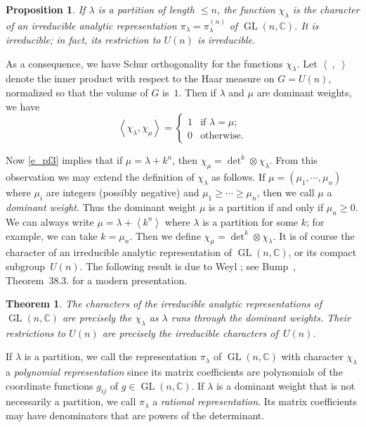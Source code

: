 \documentclass[11pt]{amsart}
\newcommand{\tmem}[1]{{\em #1\/}}
\newcommand{\tmop}[1]{\ensuremath{\operatorname{#1}}}
\newtheorem{proposition}{Proposition}
\newtheorem{theorem}{Theorem}
\begin{document}
\begin{proposition}
If $\lambda$ is a partition of length $\leqslant n$, the function
$\chi_{\lambda}$ is the character of an irreducible  analytic
representation $\pi_{\lambda} = \pi_{\lambda}^{( n )}$ of
$\tmop{GL} ( n,\mathbb{C})$. It is irreducible; in fact, its
restriction to $U ( n )$ is irreducible.
\end{proposition}

{\noindent} As a consequence, we have Schur orthogonality for the
functions $\chi_{\lambda}$. Let $\left\langle \;, \;
\right\rangle$ denote the inner product with respect to the Haar
measure on $G = U ( n )$, normalized so that the volume of $G$
is~$1$. Then if $\lambda$ and $\mu$ are dominant weights, we have
\begin{equation}
\label{ratiosschurorthog} \left\langle \chi_{\lambda}, \chi_{\mu}
\right\rangle = \left\{\begin{array}{ll}
   1 & \text{if $\lambda = \mu$} ;\\
   0 & \text{otherwise} .
\end{array}\right.
\end{equation}

Now \eqref{e_pf3} implies that if  $\mu = \lambda + k^n$, then
$\chi_{\mu} = {\det}^k \otimes \chi_{\lambda}$. From this
observation we may extend the definition of $\chi_{\lambda}$ as
follows. If $\mu = ( \mu_1, \cdots, \mu_n )$ where $\mu_i$ are
integers (possibly negative) and $\mu_1 \geqslant \cdots \geqslant
\mu_n$, then we call $\mu$ a {\tmem{dominant weight}}. Thus the
dominant weight $\mu$ is a partition if and only if $\mu_n
\geqslant 0$. We can always write $\mu = \lambda + \left\langle
k^n \right\rangle$ where $\lambda$ is a partition for some $k$;
for example, we can take $k = \mu_n$. Then we define $\chi_{\mu} =
{\det}^k \otimes \chi_{\lambda}$. It is of course the character of
an irreducible analytic representation of $\tmop{GL} (
n,\mathbb{C})$, or its compact subgroup~$U ( n )$. The following
result is due to Weyl \cite{weyl}; see Bump~{\cite{DB}},
Theorem~38.3. for a modern presentation.
\begin{theorem}
The characters of the irreducible analytic representations of
$\tmop{GL} ( n,\mathbb{C})$ are precisely the $\chi_{\lambda}$ as
$\lambda$ runs through the dominant weights. Their restrictions to
$U ( n )$ are precisely the irreducible characters of~$U ( n )$.
\end{theorem}


If $\lambda$ is a partition, we call the representation
$\pi_{\lambda}$ of $\tmop{GL} ( n,\mathbb{C})$ with character
$\chi_{\lambda}$ a {\tmem{polynomial representation}} since its
matrix coefficients are polynomials of the coordinate functions
$g_{i j}$ of $g \in \tmop{GL} ( n,\mathbb{C})$. If $\lambda$ is a
dominant weight that is not necessarily a partition, we call
$\pi_{\lambda}$ a {\tmem{rational representation}}. Its matrix
coefficients may have denominators that are powers of the
determinant.
\end{document}
